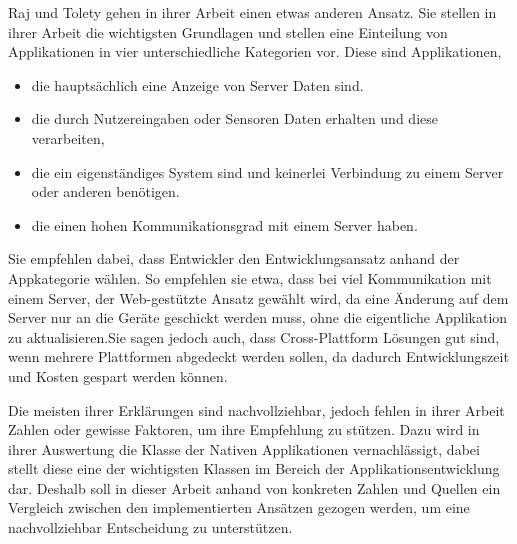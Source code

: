 Raj und Tolety \cite{IEEE_Rahul_Seshu} gehen in ihrer Arbeit einen etwas anderen Ansatz. Sie stellen in ihrer Arbeit die wichtigsten Grundlagen und stellen eine Einteilung von Applikationen in vier unterschiedliche Kategorien vor. Diese sind Applikationen,
\begin{itemize}
    \item die hauptsächlich eine Anzeige von Server Daten sind.
    \item die durch Nutzereingaben oder Sensoren Daten erhalten und diese verarbeiten,
    \item die ein eigenständiges System sind und keinerlei Verbindung zu einem Server oder anderen benötigen.
    \item die einen hohen Kommunikationsgrad mit einem Server haben.
\end{itemize}
Sie empfehlen dabei, dass Entwickler den Entwicklungsansatz anhand der Appkategorie wählen. So empfehlen sie etwa, dass bei viel Kommunikation mit einem Server, der Web-gestützte Ansatz gewählt wird, da eine Änderung auf dem Server nur an die Geräte geschickt werden muss, ohne die eigentliche Applikation zu aktualisieren.Sie sagen jedoch auch, dass Cross-Plattform Lösungen gut sind, wenn mehrere Plattformen abgedeckt werden sollen, da dadurch Entwicklungszeit und Kosten gespart werden können.

Die meisten ihrer Erklärungen sind nachvollziehbar, jedoch fehlen in ihrer Arbeit Zahlen oder gewisse Faktoren, um ihre Empfehlung zu stützen. Dazu wird in ihrer Auswertung die Klasse der Nativen Applikationen vernachlässigt, dabei stellt diese eine der wichtigsten Klassen im Bereich der Applikationsentwicklung dar. Deshalb soll in dieser Arbeit anhand von konkreten Zahlen und Quellen ein Vergleich zwischen den implementierten Ansätzen gezogen werden, um eine nachvollziehbar Entscheidung zu unterstützen.

